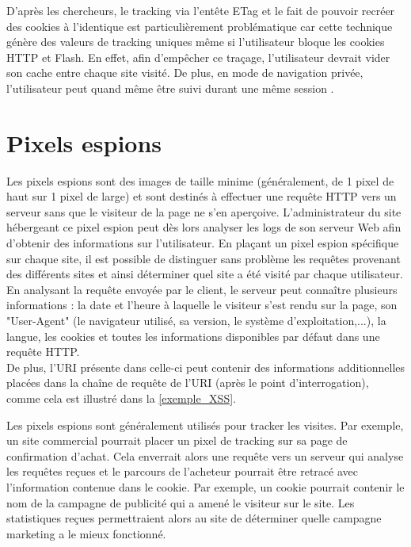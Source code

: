 D'après les chercheurs, le tracking via l'entête ETag et le fait de pouvoir recréer des cookies à l'identique est particulièrement problématique car cette technique génère des valeurs de tracking uniques même si l'utilisateur bloque les cookies HTTP et Flash. En effet, afin d'empêcher ce traçage, l'utilisateur devrait vider son cache entre chaque site visité. De plus, en mode de navigation privée, l'utilisateur peut quand même être suivi durant une même session \cite{flash_cookies_privacy_2}.

\section{Pixels espions}
\label{pixels_espions}
Les pixels espions sont des images de taille minime (généralement, de 1 pixel de haut sur 1 pixel de large) et sont destinés à effectuer une requête HTTP vers un serveur sans que le visiteur de la page ne s'en aperçoive. L'administrateur du site hébergeant ce pixel espion peut dès lors analyser les logs de son serveur Web afin d'obtenir des informations sur l'utilisateur. En plaçant un pixel espion spécifique sur chaque site, il est possible de distinguer sans problème les requêtes provenant des différents sites et ainsi déterminer quel site a été visité par chaque utilisateur.
En analysant la requête envoyée par le client, le serveur peut connaître plusieurs informations : la date et l'heure à laquelle le visiteur s'est rendu sur la page, son "User-Agent" (le navigateur utilisé, sa version, le système d'exploitation,...), la langue, les cookies et toutes les informations disponibles par défaut dans une requête HTTP.\\
De plus, l'URI présente dans celle-ci peut contenir des informations additionnelles placées dans la chaîne de requête de l'URI (après le point d'interrogation), comme cela est illustré dans la \autoref{exemple_XSS}.
\newline

Les pixels espions sont généralement utilisés pour tracker les visites. Par exemple, un site commercial pourrait placer un pixel de tracking sur sa page de confirmation d'achat. Cela enverrait alors une requête vers un serveur qui analyse les requêtes reçues et le parcours de l'acheteur pourrait être retracé avec l'information contenue dans le cookie. Par exemple, un cookie pourrait contenir le nom de la campagne de publicité qui a amené le visiteur sur le site. Les statistiques reçues permettraient alors au site de déterminer quelle campagne marketing a le mieux fonctionné.

